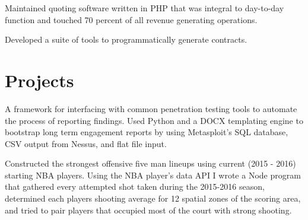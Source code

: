 \documentclass[]{deedy-resume-openfont}
\begin{document}
\begin{minipage}[t]{0.70\textwidth}
\begin{tightemize}
\item Maintained quoting software written in PHP that was integral to day-to-day function and touched 70 percent of all revenue generating operations.
\item Developed a suite of tools to programmatically generate contracts.
\end{tightemize}
\sectionsep


\section{Projects}
A framework for interfacing with common penetration testing tools to automate the process of reporting findings. Used Python and a DOCX templating engine to bootstrap long term engagement reports by using Metasploit's SQL database, CSV output from Nessus, and flat file input.
\sectionsep

Constructed the strongest offensive five man lineups using current (2015 - 2016) starting NBA players. Using the NBA player's data API I wrote a Node program that gathered every attempted shot taken during the 2015-2016 season, determined each players shooting average for 12 spatial zones of the scoring area, and tried to pair players that occupied most of the court with strong shooting.
\sectionsep


\end{minipage} 
\end{document}
